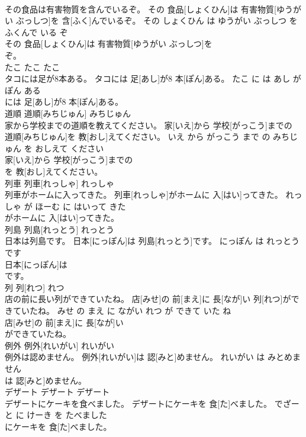 \documentclass[8pt]{extreport}
\begin{document}
\begin{CJK}{UTF8}{min}
\\	その食品は有害物質を含んでいるぞ。	その 食品[しょくひん]は 有害物質[ゆうがい ぶっしつ]を 含[ふく]んでいるぞ。	その しょくひん は ゆうがい ぶっしつ を ふくんで いる ぞ	
\\	その 食品[しょくひん]は 有害物質[ゆうがい ぶっしつ]を
\\	ぞ。			
\\	たこ	たこ	たこ	
\\	タコには足が8本ある。	タコには 足[あし]が8 本[ぽん]ある。	たこ に は あし が 
\\	ぽん ある	
\\	には 足[あし]が8 本[ぽん]ある。			
\\	道順	道順[みちじゅん]	みちじゅん	
\\	家から学校までの道順を教えてください。	家[いえ]から 学校[がっこう]までの 道順[みちじゅん]を 教[おし]えてください。	いえ から がっこう まで の みちじゅん を おしえて ください	
\\	家[いえ]から 学校[がっこう]までの
\\	を 教[おし]えてください。			
\\	列車	列車[れっしゃ]	れっしゃ	
\\	列車がホームに入ってきた。	列車[れっしゃ]がホームに 入[はい]ってきた。	れっしゃ が ほーむ に はいって きた	
\\	がホームに 入[はい]ってきた。			
\\	列島	列島[れっとう]	れっとう	
\\	日本は列島です。	日本[にっぽん]は 列島[れっとう]です。	にっぽん は れっとう です	
\\	日本[にっぽん]は
\\	です。			
\\	列	列[れつ]	れつ	
\\	店の前に長い列ができていたね。	店[みせ]の 前[まえ]に 長[なが]い 列[れつ]ができていたね。	みせ の まえ に ながい れつ が できて いた ね	
\\	店[みせ]の 前[まえ]に 長[なが]い
\\	ができていたね。			
\\	例外	例外[れいがい]	れいがい	
\\	例外は認めません。	例外[れいがい]は 認[みと]めません。	れいがい は みとめません	
\\	は 認[みと]めません。			
\\	デザート	デザート	デザート	
\\	デザートにケーキを食べました。	デザートにケーキを 食[た]べました。	でざーと に けーき を たべました	
\\	にケーキを 食[た]べました。			

\end{CJK}
\end{document}
